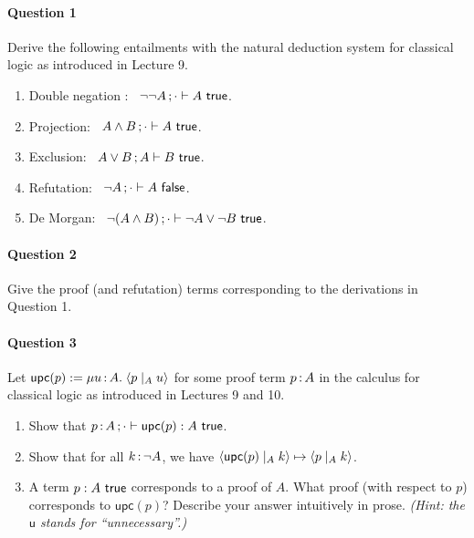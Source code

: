 \documentclass[11pt,a4paper,twoside]{article}
\begin{document}
\paragraph{Question 1} Derive the following entailments with the natural deduction system for classical logic as introduced in Lecture 9.

\begin{enumerate}[label=(\alph*)]
  \item Double negation : \ $\neg\neg A \, ; \cdot \vdash A\ \mathsf{true}$.

  \item Projection: \ $A \land B \, ; \cdot \vdash A\ \mathsf{true}$.

  \item Exclusion: \ $A \lor B \, ; A \vdash B\ \mathsf{true} $.

  \item Refutation: \ $\neg A \, ; \cdot \vdash A\ \mathsf{false}$.

  \item De Morgan: \ $\neg(A \land B) \, ; \cdot \vdash \neg A \lor \neg B\ \mathsf{true}$.
\end{enumerate}

\paragraph{Question 2} Give the proof (and refutation) terms corresponding to the derivations in Question 1.

\paragraph{Question 3} Let $\mathsf{upc}(p) := \mu u \,{:}\, A .\; \langle p \mid_{A} u \rangle$ for some proof term $p \,{:}\, A$ in the calculus for classical logic as introduced in Lectures 9 and 10.

\begin{enumerate}[label=(\alph*)]
  \item Show that $p \,{:}\, A \, ; \cdot \vdash \mathsf{upc}(p) : A\ \mathsf{true}$.

  \item Show that for all $k \,{:}\, \neg A$, we have $\langle \mathsf{upc}(p) \mid_{A} k \rangle \mapsto \langle p \mid_{A} k \rangle$.

  \item A term $p : A\ \mathsf{true}$ corresponds to a proof of $A$. 
    What proof (with respect to $p$) corresponds to $\mathsf{upc}(p)$?
    Describe your answer intuitively in prose.
    \emph{(Hint: the $\mathsf{u}$ stands for ``unnecessary''.)}
\end{enumerate}
\end{document}

